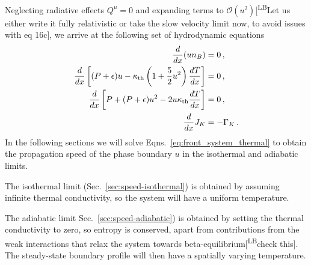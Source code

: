 \documentclass[10pt,superscriptaddress,
amsmath,aps,prc,twocolumn,nofootinbib,floatfix]{revtex4-1}
\newcommand{\mgacom}[1]{\textsf{\color[rgb]{0.8,0,0}[\textsuperscript{MGA} #1]}}
\newcommand{\LBcom}[1]{\textsf{\color{blue}[\textsuperscript{LB}#1]}}
\newcommand{\JS}[1]{{\color{violet}#1}}
\newcommand{\eps}{\epsilon}
\begin{document}
Neglecting radiative effects $Q^\mu=0$ and expanding terms to $\mathcal{O}(u^2)$\LBcom{Let us either write it fully relativistic or take the slow velocity limit now, to avoid issues with eq 16c}, we arrive at the following set of hydrodynamic equations
%
\begin{subequations}\label{eq:front_system_thermal}
\begin{align}
\frac{d}{dx}(u n_B)&= 0\,, 
\label{eq:baryon_conservation_thermal}\\
\frac{d}{dx}\left[(P+\eps)u-\kappa_{\rm th}\left(1+\frac{5}{2}u^2\right)\frac{dT}{dx}\right] &=0\,,
\label{eq:energy_conservation_thermal}\\
 \frac{d}{dx}\left[P+(P+\eps)u^2-2u\kappa_{\rm th}\frac{dT}{dx}\right]&=0\,,
 \label{eq:momentum_conservation_thermal}\\
 \frac{d}{dx}J_K &= -\Gamma_K\,.
    \label{eq:K_conservation_thermal}
\end{align}
\end{subequations}
In the following sections we will solve %
Eqns.~\ref{eq:front_system_thermal}
to obtain the propagation speed of the phase boundary $u$ in the isothermal and adiabatic limits. 

The isothermal limit (Sec.~\ref{sec:speed-isothermal}) is obtained by assuming infinite thermal conductivity, so the system will have a uniform temperature.

The adiabatic limit Sec.~\ref{sec:speed-adiabatic}) is obtained by setting the thermal conductivity to zero, so entropy is conserved, apart from
contributions from the weak interactions that
relax the system towards beta-equilibrium\LBcom{check this}.
The steady-state boundary profile will then have a spatially varying temperature.
\end{document}
